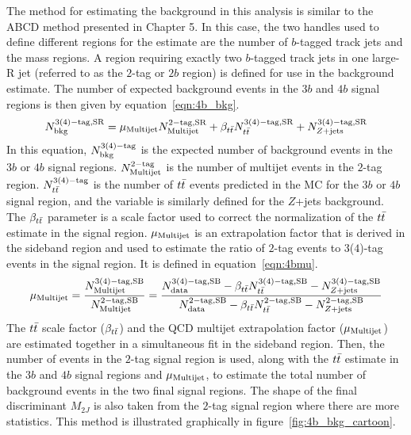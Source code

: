 The method for estimating the background in this analysis is similar to the ABCD method presented in Chapter 5. In this case, the two handles used to define different regions for the estimate are the number of $b$-tagged track jets and the mass regions. A region requiring exactly two $b$-tagged track jets in one large-R jet (referred to as the $2$-tag or $2b$ region) is defined for use in the background estimate. The number of expected background events in the $3b$ and $4b$ signal regions is then given by equation~\ref{eqn:4b_bkg}.
%
\begin{equation}
\label{eqn:4b_bkg}
N_{\rm bkg}^{\rm 3(4)-tag, SR} = \mu_{\rm Multijet} N_{\rm Multijet}^{\rm 2-tag, SR} + \beta_{t\bar{t}} N_{t\bar{t}}^{\rm 3(4)-tag, SR} + N_{Z+ \rm jets}^{\rm 3(4)-tag, SR}
\end{equation}
%
In this equation, $N_{\rm bkg}^{\rm 3(4)-tag}$ is the expected number of background events in the $3b$ or $4b$ signal regions. $N_{\rm Multijet}^{\rm 2-tag}$ is the number of multijet events in the $2$-tag region. $N_{t\bar{t}}^{\rm 3(4)-tag}$ is the number of $t\bar{t}$ events predicted in the MC for the $3b$ or $4b$ signal region, and the variable is similarly defined for the $Z$+jets background. The $\beta_{t\bar{t}}$ parameter is a scale factor used to correct the normalization of the $t\bar{t}$ estimate in the signal region. $\mu_{\rm Multijet}$ is an extrapolation factor that is derived in the sideband region and used to estimate the ratio of $2$-tag events to $3$($4$)-tag events in the signal region. It is defined in equation~\ref{eqn:4bmu}.
%
\begin{equation}
\label{eqn:4bmu}
\mu_{\rm Multijet} = \frac{N_{\rm Multijet}^{\rm 3(4)-tag, SB}}{N_{\rm Multijet}^{\rm 2-tag, SB}} = \frac{N_{\rm data}^{\rm 3(4)-tag, SB} - \beta_{t\bar{t}} N_{t\bar{t}}^{\rm 3(4)-tag, SB} - N_{Z+ \rm jets}^{\rm 3(4)-tag, SB}}{N_{\rm data}^{\rm 2-tag, SB} - \beta_{t\bar{t}} N_{t\bar{t}}^{\rm 2-tag, SB} - N_{Z+ \rm jets}^{\rm 2-tag, SB}}
\end{equation}
%
The $t\bar{t}$ scale factor ($\beta_{t\bar{t}}$) and the QCD multijet extrapolation factor ($\mu_{\rm Multijet}$) are estimated together in a simultaneous fit in the sideband region. Then, the number of events in the $2$-tag signal region is used, along with the $t\bar{t}$ estimate in the $3b$ and $4b$ signal regions and $\mu_{\rm Multijet}$, to estimate the total number of background events in the two final signal regions. The shape of the final discriminant $M_{2J}$ is also taken from the $2$-tag signal region where there are more statistics. This method is illustrated graphically in figure~\ref{fig:4b_bkg_cartoon}.

